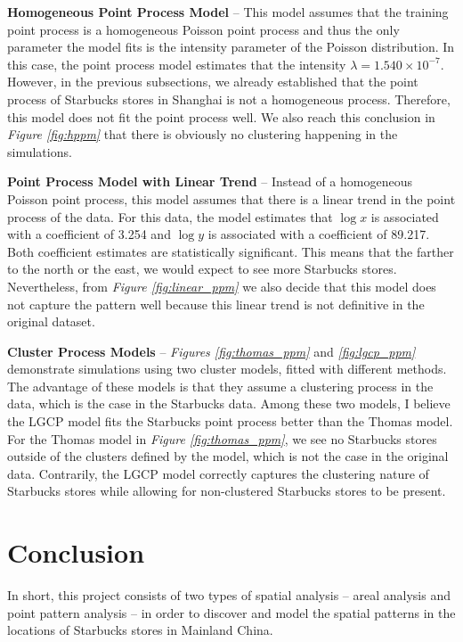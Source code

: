 \documentclass{article}
\begin{document}
\textbf{Homogeneous Point Process Model} -- This model assumes that the training point process is a homogeneous Poisson point process and thus the only parameter the model fits is the intensity parameter of the Poisson distribution. In this case, the point process model estimates that the intensity \(\lambda = 1.540 \times 10 ^ {-7}\). However, in the previous subsections, we already established that the point process of Starbucks stores in Shanghai is not a homogeneous process. Therefore, this model does not fit the point process well. We also reach this conclusion in \textit{Figure \ref{fig:hppm}} that there is obviously no clustering happening in the simulations.

\textbf{Point Process Model with Linear Trend} -- Instead of a homogeneous Poisson point process, this model assumes that there is a linear trend in the point process of the data. For this data, the model estimates that \(\log x\) is associated with a coefficient of 3.254 and \(\log y\) is associated with a coefficient of 89.217. Both coefficient estimates are statistically significant. This means that the farther to the north or the east, we would expect to see more Starbucks stores. Nevertheless, from \textit{Figure \ref{fig:linear_ppm}} we also decide that this model does not capture the pattern well because this linear trend is not definitive in the original dataset.

\textbf{Cluster Process Models} -- \textit{Figures \ref{fig:thomas_ppm}} and \textit{\ref{fig:lgcp_ppm}} demonstrate simulations using two cluster models, fitted with different methods. The advantage of these models is that they assume a clustering process in the data, which is the case in the Starbucks data. Among these two models, I believe the LGCP model fits the Starbucks point process better than the Thomas model. For the Thomas model in \textit{Figure \ref{fig:thomas_ppm}}, we see no Starbucks stores outside of the clusters defined by the model, which is not the case in the original data. Contrarily, the LGCP model correctly captures the clustering nature of Starbucks stores while allowing for non-clustered Starbucks stores to be present.

\section{Conclusion}

In short, this project consists of two types of spatial analysis -- areal analysis and point pattern analysis -- in order to discover and model the spatial patterns in the locations of Starbucks stores in Mainland China.
\end{document}
